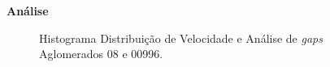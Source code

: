 \documentclass[xcolor=dvipsnames,10pt]{beamer}
\begin{document}
\begin{frame}{\textbf{Análise}}
  \begin{figure}[!htbp]
    \centering
    \caption{Histograma Distribuição de Velocidade e Análise de \textit{gaps} Aglomerados 08 e 00996.}
  \end{figure}
\end{frame}
\end{document}
